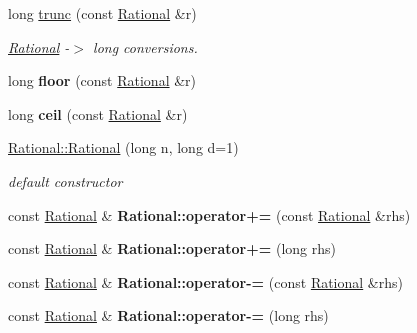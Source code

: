 \begin{DoxyCompactItemize}
long \mbox{\hyperlink{group__general_ga2ae32e90a2bacd18ca646568cb6c456e}{trunc}} (const \mbox{\hyperlink{classRational}{Rational}} \&r)
\begin{DoxyCompactList}\small\item\em \mbox{\hyperlink{classRational}{Rational}} -\/$>$ long conversions. \end{DoxyCompactList}\item 
\mbox{\label{group__general_gab93ceb248e49c0c1bdf83bee735aea49}} 
long {\bfseries floor} (const \mbox{\hyperlink{classRational}{Rational}} \&r)
\item 
\mbox{\label{group__general_ga883dcb56e5cb54c652d0eb4e939fd066}} 
long {\bfseries ceil} (const \mbox{\hyperlink{classRational}{Rational}} \&r)
\item 
\mbox{\label{group__general_ga664c91d4ee5ad46c39e765e6dbf81738}} 
\mbox{\hyperlink{group__general_ga664c91d4ee5ad46c39e765e6dbf81738}{Rational\+::\+Rational}} (long n, long d=1)
\begin{DoxyCompactList}\small\item\em default constructor \end{DoxyCompactList}\item 
\mbox{\label{group__general_gaa857f0a929a6898f30b97ba00c463ae6}} 
const \mbox{\hyperlink{classRational}{Rational}} \& {\bfseries Rational\+::operator+=} (const \mbox{\hyperlink{classRational}{Rational}} \&rhs)
\item 
\mbox{\label{group__general_gada510c5ee2bbcc7d7f12b8f25b539eff}} 
const \mbox{\hyperlink{classRational}{Rational}} \& {\bfseries Rational\+::operator+=} (long rhs)
\item 
\mbox{\label{group__general_ga196f4fcc358d405bbd98a7248bfc75f5}} 
const \mbox{\hyperlink{classRational}{Rational}} \& {\bfseries Rational\+::operator-\/=} (const \mbox{\hyperlink{classRational}{Rational}} \&rhs)
\item 
\mbox{\label{group__general_ga33cc7c599a1a3ac9a13bfe104c4456f4}} 
const \mbox{\hyperlink{classRational}{Rational}} \& {\bfseries Rational\+::operator-\/=} (long rhs)
\item 

\end{DoxyCompactItemize}
